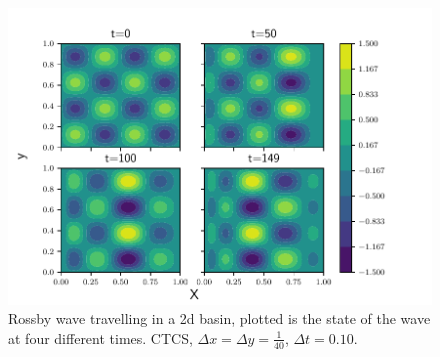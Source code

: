 \begin{figure}[H]
  \centering
  \includegraphics[width=\textwidth]{../figures/bounded_2d.pdf}
  \caption{Rossby wave travelling in a 2d basin, plotted is the state of the wave  at four different times. CTCS, $\Delta x = \Delta y = \frac{1}{40}$, $\Delta t = 0.10$.}
  \label{fig:2d_bounded}
\end{figure}
